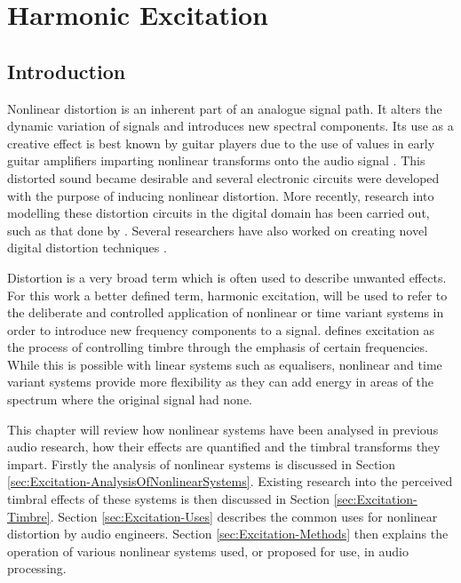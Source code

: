 \chapter{Harmonic Excitation}
\label{chap:Excitation}

\section{Introduction}
\label{sec:Excitation-Introduction}
	Nonlinear distortion is an inherent part of an analogue signal path. It alters the dynamic variation of signals and
	introduces new spectral components. Its use as a creative effect is best known by guitar players due to the use of
	values in early guitar amplifiers imparting nonlinear transforms onto the audio signal
	\citep{dutilleux2011nonlinear}. This distorted sound became desirable and several electronic circuits were developed
	with the purpose of inducing nonlinear distortion. More recently, research into modelling these distortion circuits
	in the digital domain has been carried out, such as that done by \citet{pakarinen2009a}. Several researchers have
	also worked on creating novel digital distortion techniques \citep{fernandez-cid2001distortion, puckette2007patch,
	pekonen2008coefficient}.

	Distortion is a very broad term which is often used to describe unwanted effects. For this work a better defined
	term, harmonic excitation, will be used to refer to the deliberate and controlled application of nonlinear or time
	variant systems in order to introduce new frequency components to a signal. \citet{dutilleux2011nonlinear} defines
	excitation as the process of controlling timbre through the emphasis of certain frequencies. While this is possible
	with linear systems such as equalisers, nonlinear and time variant systems provide more flexibility as they can add
	energy in areas of the spectrum where the original signal had none.

	This chapter will review how nonlinear systems have been analysed in previous audio research, how their effects are
	quantified and the timbral transforms they impart. Firstly the analysis of nonlinear systems is discussed in Section
	\ref{sec:Excitation-AnalysisOfNonlinearSystems}. Existing research into the perceived timbral effects of these
	systems is then discussed in Section \ref{sec:Excitation-Timbre}. Section \ref{sec:Excitation-Uses} describes the
	common uses for nonlinear distortion by audio engineers. Section \ref{sec:Excitation-Methods} then explains the
	operation of various nonlinear systems used, or proposed for use, in audio processing.

